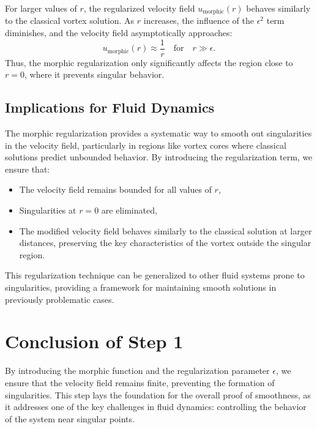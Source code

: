 \documentclass{article}
\begin{document}
For larger values of \( r \), the regularized velocity field \( u_{\text{morphic}}(r) \) behaves similarly to the classical vortex solution. As \( r \) increases, the influence of the \( \epsilon^2 \) term diminishes, and the velocity field asymptotically approaches:
\[
u_{\text{morphic}}(r) \approx \frac{1}{r} \quad \text{for} \quad r \gg \epsilon.
\]
Thus, the morphic regularization only significantly affects the region close to \( r = 0 \), where it prevents singular behavior.

\subsection*{Implications for Fluid Dynamics}

The morphic regularization provides a systematic way to smooth out singularities in the velocity field, particularly in regions like vortex cores where classical solutions predict unbounded behavior. By introducing the regularization term, we ensure that:
\begin{itemize}
    \item The velocity field remains bounded for all values of \( r \),
    \item Singularities at \( r = 0 \) are eliminated,
    \item The modified velocity field behaves similarly to the classical solution at larger distances, preserving the key characteristics of the vortex outside the singular region.
\end{itemize}

This regularization technique can be generalized to other fluid systems prone to singularities, providing a framework for maintaining smooth solutions in previously problematic cases.

\section*{Conclusion of Step 1}

By introducing the morphic function and the regularization parameter \( \epsilon \), we ensure that the velocity field remains finite, preventing the formation of singularities. This step lays the foundation for the overall proof of smoothness, as it addresses one of the key challenges in fluid dynamics: controlling the behavior of the system near singular points.
\end{document}

